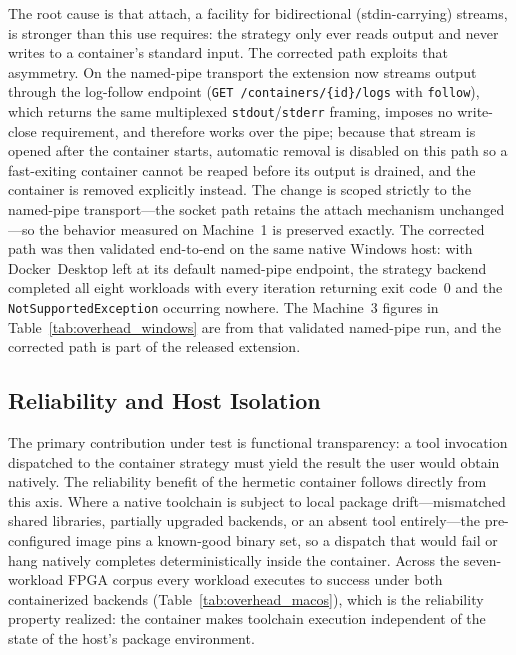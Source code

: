 The root cause is that attach, a facility for bidirectional (stdin-carrying) streams, is stronger than this use requires: the strategy only ever reads output and never writes to a container's standard input. The corrected path exploits that asymmetry. On the named-pipe transport the extension now streams output through the log-follow endpoint (\texttt{GET /containers/\{id\}/logs} with \texttt{follow}), which returns the same multiplexed \texttt{stdout}/\texttt{stderr} framing, imposes no write-close requirement, and therefore works over the pipe; because that stream is opened after the container starts, automatic removal is disabled on this path so a fast-exiting container cannot be reaped before its output is drained, and the container is removed explicitly instead. The change is scoped strictly to the named-pipe transport---the socket path retains the attach mechanism unchanged---so the behavior measured on Machine~1 is preserved exactly. The corrected path was then validated end-to-end on the same native Windows host: with Docker~Desktop left at its default named-pipe endpoint, the strategy backend completed all eight workloads with every iteration returning exit code~0 and the \texttt{NotSupportedException} occurring nowhere. The Machine~3 figures in Table~\ref{tab:overhead_windows} are from that validated named-pipe run, and the corrected path is part of the released extension.

\clearpage
\subsection{Reliability and Host Isolation}
The primary contribution under test is functional transparency: a tool invocation dispatched to the container strategy must yield the result the user would obtain natively. The reliability benefit of the hermetic container follows directly from this axis. Where a native toolchain is subject to local package drift---mismatched shared libraries, partially upgraded backends, or an absent tool entirely---the pre-configured image pins a known-good binary set, so a dispatch that would fail or hang natively completes deterministically inside the container. Across the seven-workload FPGA corpus every workload executes to success under both containerized backends (Table~\ref{tab:overhead_macos}), which is the reliability property realized: the container makes toolchain execution independent of the state of the host's package environment.

